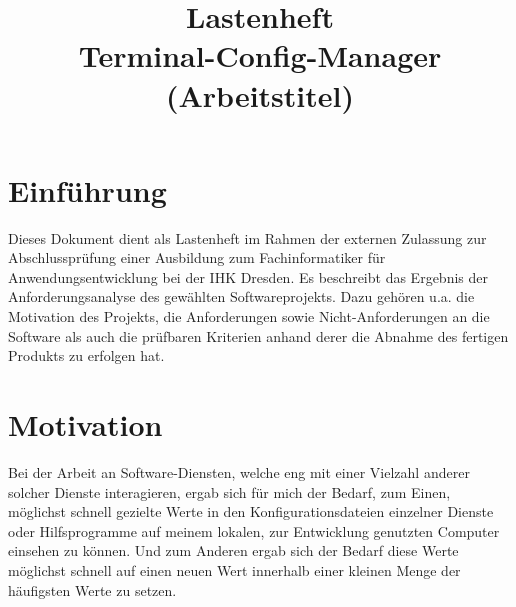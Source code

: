 \documentclass[11pt]{article}
\title{Lastenheft\\[0.2em]\smaller{}Terminal-Config-Manager (Arbeitstitel)}
\begin{document}
\maketitle
{}
\newpage
{}
\tableofcontents

\section{Einführung}
Dieses Dokument dient als Lastenheft im Rahmen der externen Zulassung  zur Abschlussprüfung einer Ausbildung zum Fachinformatiker für Anwendungsentwicklung bei der IHK Dresden. Es beschreibt das Ergebnis der Anforderungsanalyse des gewählten Softwareprojekts. Dazu gehören u.a. die Motivation des Projekts, die Anforderungen sowie Nicht-Anforderungen an die Software als auch die prüfbaren Kriterien anhand derer die Abnahme des fertigen Produkts zu erfolgen hat.

\section{Motivation}
Bei der Arbeit an Software-Diensten, welche eng mit einer Vielzahl anderer solcher Dienste interagieren, ergab sich für mich der Bedarf, zum Einen, möglichst schnell gezielte Werte in den Konfigurationsdateien einzelner Dienste oder Hilfsprogramme auf meinem lokalen, zur Entwicklung genutzten Computer einsehen zu können. Und zum Anderen ergab sich der Bedarf diese Werte möglichst schnell auf einen neuen Wert innerhalb einer kleinen Menge der häufigsten Werte zu setzen.
\end{document}

